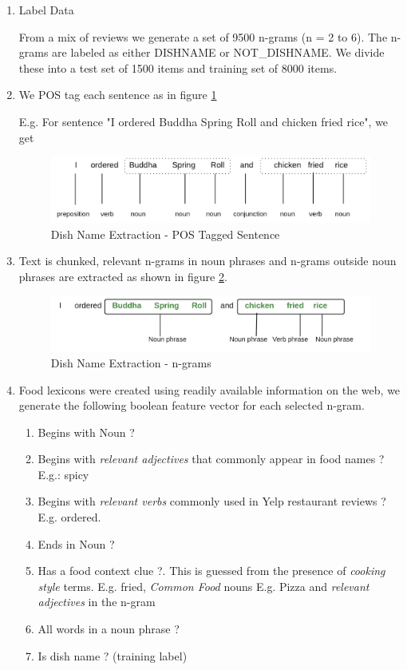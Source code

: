 \documentclass[twoside,12pt]{article}
\begin{document}
\begin{enumerate}
\item
Label Data

From a mix of reviews we generate a set of 9500 n-grams (n = 2 to 6). The n-grams are labeled as either DISHNAME or NOT\_DISHNAME. We divide these into a test set of 1500 items and training set of 8000 items.

\item
We POS tag each sentence as in figure \ref{fig:dish_name_extraction_pos_tagged_sentence}

E.g. For sentence "I ordered Buddha Spring Roll and chicken fried rice", we get

\begin{figure}[ht]
  \includegraphics[width=\textwidth]{pos1.png}	
  \caption{Dish Name Extraction - POS Tagged Sentence }
  \label{fig:dish_name_extraction_pos_tagged_sentence}
\end{figure}


\item
Text is chunked, relevant n-grams in noun phrases and  n-grams outside noun phrases are extracted as shown in figure \ref{fig:dish_name_extraction_n_grams}.

\begin{figure}[ht]
  \includegraphics[width=\textwidth]{pos3.png}	
  \caption{Dish Name Extraction - n-grams}
  \label{fig:dish_name_extraction_n_grams}
\end{figure}


\item
Food lexicons were created using readily available information on the web, we  generate the following boolean feature vector for each selected n-gram.

\begin{enumerate}
\item
Begins with Noun ?
\item
Begins with \textit{relevant adjectives} that commonly appear in food names ? E.g.: spicy
\item
Begins with \textit{relevant verbs} commonly used in Yelp restaurant reviews ? E.g. ordered.
\item
Ends in Noun ?
\item
Has a food context clue ?. This is guessed from the presence of  \textit{cooking style} terms. E.g. fried,  \textit{Common Food} nouns E.g. Pizza and \textit{relevant adjectives} in the n-gram
\item
All words in a noun phrase ?
\item
Is dish name ? (training label)
\end{enumerate}



\end{enumerate}
\end{document}
